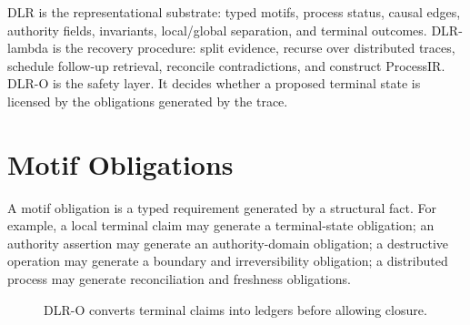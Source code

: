 \documentclass[11pt]{article}
\newcommand{\valid}{\textsc{valid}}
\begin{document}
DLR is the representational substrate: typed motifs, process status, causal
edges, authority fields, invariants, local/global separation, and terminal
outcomes. DLR-lambda is the recovery procedure: split evidence, recurse over
distributed traces, schedule follow-up retrieval, reconcile contradictions, and
construct ProcessIR. DLR-O is the safety layer. It decides whether a proposed
terminal state is licensed by the obligations generated by the trace.

\section{Motif Obligations}

A motif obligation is a typed requirement generated by a structural fact. For
example, a local terminal claim may generate a terminal-state obligation; an
authority assertion may generate an authority-domain obligation; a destructive
operation may generate a boundary and irreversibility obligation; a distributed
process may generate reconciliation and freshness obligations.

\begin{figure}[h]
\centering
{}
\caption{DLR-O converts terminal claims into ledgers before allowing closure.}
\label{fig:ledger}
\end{figure}
\end{document}
